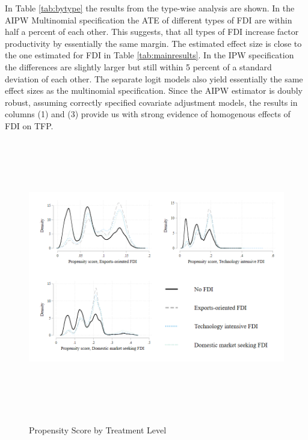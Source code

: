 \documentclass[a4paper,11pt]{scrartcl}
\begin{document}
In Table \ref{tab:bytype} the results from the type-wise analysis are shown. In the AIPW Multinomial specification the ATE of different types of FDI are within half a percent of each other. This suggests, that all types of FDI increase factor productivity by essentially the same margin. The estimated effect size is close to the one estimated for FDI in Table \ref{tab:mainresults}. In the IPW specification the differences are slightly larger but still within 5 percent of a standard deviation of each other.  The separate logit models also yield essentially the same effect sizes as the multinomial specification. Since the AIPW estimator is doubly robust, assuming correctly specified covariate adjustment models, the results in columns (1) and (3) provide us with strong evidence of homogenous effects of FDI on TFP.


\begin{figure}[h]
	
	\caption{Propensity Score by Treatment Level}
\hspace*{-2cm}  	
	\includegraphics[height=12cm]{overlap_type.png}\\ 
	\label{fig:over_typ}
 
\end{figure}
\end{document}
